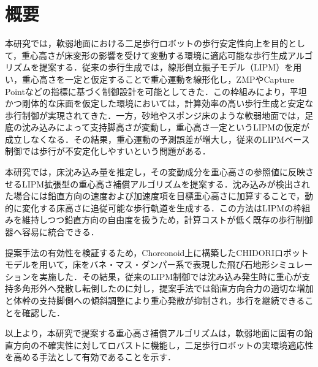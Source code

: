 \chapter*{概要}
\thispagestyle{empty}
%
本研究では，軟弱地面における二足歩行ロボットの歩行安定性向上を目的として，重心高さが床変形の影響を受けて変動する環境に適応可能な歩行生成アルゴリズムを提案する．従来の歩行生成では，線形倒立振子モデル（LIPM）を用い，重心高さを一定と仮定することで重心運動を線形化し，ZMPやCapture Pointなどの指標に基づく制御設計を可能としてきた．この枠組みにより，平坦かつ剛体的な床面を仮定した環境においては，計算効率の高い歩行生成と安定な歩行制御が実現されてきた．一方，砂地やスポンジ床のような軟弱地面では，足底の沈み込みによって支持脚高さが変動し，重心高さ一定というLIPMの仮定が成立しなくなる．その結果，重心運動の予測誤差が増大し，従来のLIPMベース制御では歩行が不安定化しやすいという問題がある．

本研究では，床沈み込み量を推定し，その変動成分を重心高さの参照値に反映させるLIPM拡張型の重心高さ補償アルゴリズムを提案する．沈み込みが検出された場合には鉛直方向の速度および加速度項を目標重心高さに加算することで，動的に変化する床高さに追従可能な歩行軌道を生成する．この方法はLIPMの枠組みを維持しつつ鉛直方向の自由度を扱うため，計算コストが低く既存の歩行制御器へ容易に統合できる．

提案手法の有効性を検証するため，Choreonoid上に構築したCHIDORIロボットモデルを用いて，床をバネ・マス・ダンパー系で表現した飛び石地形シミュレーションを実施した．その結果，従来のLIPM制御では沈み込み発生時に重心が支持多角形外へ発散し転倒したのに対し，提案手法では鉛直方向合力の適切な増加と体幹の支持脚側への傾斜調整により重心発散が抑制され，歩行を継続できることを確認した．

以上より，本研究で提案する重心高さ補償アルゴリズムは，軟弱地面に固有の鉛直方向の不確実性に対してロバストに機能し，二足歩行ロボットの実環境適応性を高める手法として有効であることを示す．